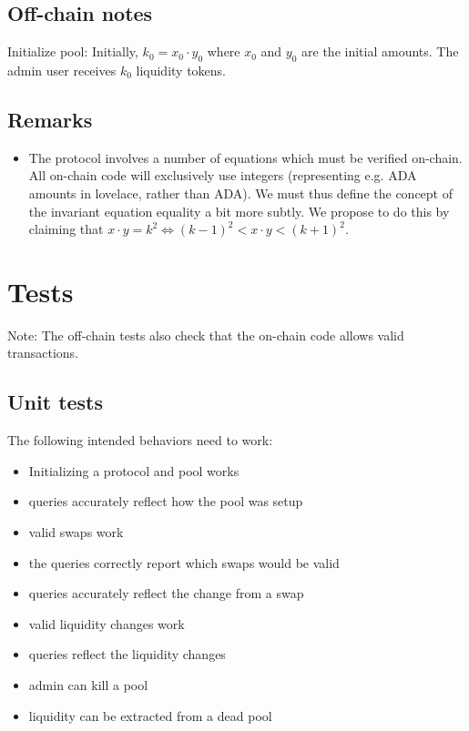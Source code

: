 \documentclass{article}
\begin{document}
\subsection{Off-chain notes}

Initialize pool: Initially, $k_0 = x_0 \cdot y_0$ where $x_0$ and $y_0$ are the
initial amounts. The admin user receives $k_0$ liquidity tokens.


\subsection{Remarks}

\begin{itemize}
  \item The protocol involves a number of equations which must be verified
    on-chain. All on-chain code will exclusively use integers (representing e.g.
    ADA amounts in lovelace, rather than ADA). We must thus define the concept
    of the invariant equation equality a bit more subtly. We propose to do this
    by claiming that $x \cdot y = k^2 \Leftrightarrow (k-1)^2 < x \cdot y <
    (k+1)^2$.
\end{itemize}

\section{Tests}


Note: The off-chain tests also check that the on-chain code allows valid
transactions.


\subsection{Unit tests}

The following intended behaviors need to work:
\begin{itemize}
  \item Initializing a protocol and pool works
  \item queries accurately reflect how the pool was setup
  \item valid swaps work
  \item the queries correctly report which swaps would be valid
  \item queries accurately reflect the change from a swap
  \item valid liquidity changes work
  \item queries reflect the liquidity changes
  \item admin can kill a pool
  \item liquidity can be extracted from a dead pool
\end{itemize}
\end{document}
